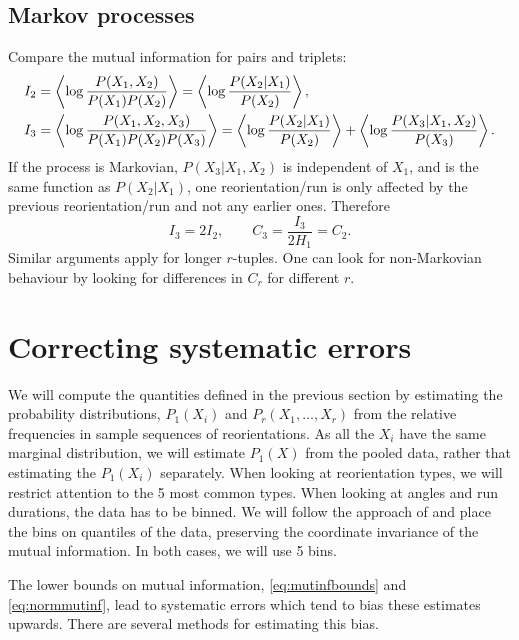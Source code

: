 \documentclass[12pt]{article}
\begin{document}
\subsection{Markov processes}\label{sec:markov}

Compare the mutual information for pairs and triplets:
%
\begin{equation}\label{eq:parivstripgen}
  \begin{aligned}
    I_2 &= \left\langle \log \frac{P(X_1,X_2)}{P(X_1)P(X_2)} \right\rangle =  \left\langle \log \frac{P(X_2 \vert X_1)}{P(X_2)} \right\rangle, \\
    I_3 &= \left\langle \log \frac{P(X_1,X_2,X_3)}{P(X_1)P(X_2)P(X_3)} \right\rangle =  \left\langle \log \frac{P(X_2 \vert X_1)}{P(X_2)} \right\rangle + \left\langle \log \frac{P(X_3 \vert X_1,X_2)}{P(X_3)} \right\rangle.
  \end{aligned}
\end{equation}
%
If the process is Markovian, $P(X_3 \vert X_1,X_2)$ is independent of $X_1$, and is the same function as $P(X_2 \vert X_1)$, \ie one reorientation/run is only affected by the previous reorientation/run and not any earlier ones. Therefore
%
\begin{equation}\label{eq:tripvspair}
  I_3 = 2I_2, \qquad C_3 = \frac{I_3}{2H_1} = C_2.
\end{equation}
%
Similar arguments apply for longer $r$-tuples. One can look for non-Markovian behaviour by looking for differences in $C_r$ for different $r$.


\section{Correcting systematic errors}\label{sec:syscorr}

We will compute the quantities defined in the previous section by estimating the probability distributions, $P_1(X_i)$ and $P_r(X_1,\ldots,X_r)$ from the relative frequencies in sample sequences of reorientations. As all the $X_i$ have the same marginal distribution, we will estimate $P_1(X)$ from the pooled data, rather that estimating the $P_1(X_i)$ separately. When looking at reorientation types, we will restrict attention to the 5 most common types. When looking at angles and run durations, the data has to be binned. We will follow the approach of \cite{2005cs........2017S} and place the bins on quantiles of the data, preserving the coordinate invariance of the mutual information. In both cases, we will use 5 bins.


The lower bounds on mutual information, \eqref{eq:mutinfbounds} and \eqref{eq:normmutinf}, lead to systematic errors which tend to bias these estimates upwards. There are several methods for estimating this bias.
\end{document}
